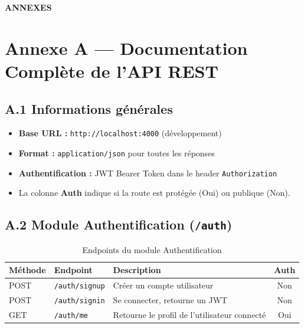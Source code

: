 \thispagestyle{normalpage}

\begin{center}
    \large \textbf{ANNEXES}
\end{center}

\section*{Annexe A — Documentation Complète de l'API REST}
\label{annexe:api}

\subsection*{A.1 Informations générales}
\begin{itemize}
    \item \textbf{Base URL :} \texttt{http://localhost:4000} (développement)
    \item \textbf{Format :} \texttt{application/json} pour toutes les réponses
    \item \textbf{Authentification :} JWT Bearer Token dans le header \texttt{Authorization}
    \item La colonne \textbf{Auth} indique si la route est protégée (Oui) ou publique (Non).
\end{itemize}

\subsection*{A.2 Module Authentification (\texttt{/auth})}

\begin{table}[H]
    \centering
    \begin{tabular}{|l|l|p{5.5cm}|c|}
        \hline
        \textbf{Méthode} & \textbf{Endpoint} & \textbf{Description} & \textbf{Auth} \\
        \hline
        POST & \texttt{/auth/signup} & Créer un compte utilisateur & Non \\
        \hline
        POST & \texttt{/auth/signin} & Se connecter, retourne un JWT & Non \\
        \hline
        GET  & \texttt{/auth/me} & Retourne le profil de l'utilisateur connecté & Oui \\
        \hline
    \end{tabular}
    \caption{Endpoints du module Authentification}
\end{table}

